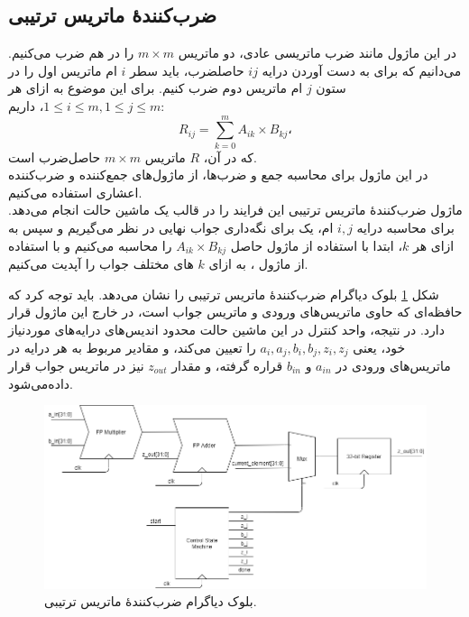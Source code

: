 \documentclass[conference]{IEEEtran-ModifiedForMVIP}
\begin{document}
\subsection{
    ضرب‌کنندهٔ ماتریس ترتیبی
}

در این ماژول مانند ضرب ماتریسی عادی، دو ماتریس 
$m \times m$
را در هم ضرب می‌کنیم. می‌دانیم که برای به دست آوردن درایه 
$ij$
حاصلضرب، باید سطر $i$ ام ماتریس اول را در ستون $j$ ام ماتریس دوم ضرب کنیم. برای این موضوع به ازای هر 
$1\leq i\leq m , 1\leq j\leq m $،
داریم:
$$R_{ij} = \sum_{k=0}^m{A_{ik} \times B_{kj}}،$$
که در آن،
$R$
ماتریس
$m \times m$
حاصل‌ضرب است.\\
در این ماژول برای محاسبه جمع و ضرب‌ها، از ماژول‌های جمع‌کننده و ضرب‌کننده اعشاری
 استفاده می‌کنیم.\\
ماژول ضرب‌کنندهٔ ماتریس ترتیبی
 این فرایند را در قالب یک ماشین حالت انجام می‌دهد. برای محاسبه درایه $i,j$ ام، یک 
 برای نگه‌داری جواب نهایی در نظر می‌گیریم و سپس
  به ازای هر $k$، ابتدا با استفاده از ماژول 
  حاصل
$A_{ik}\times B_{kj}$
 را محاسبه می‌کنیم و با استفاده از ماژول
 ، به ازای $k$ های مختلف جواب را آپدیت می‌کنیم.  

شکل
\ref{fig:SequentialBD}
بلوک دیاگرام ضرب‌کنندهٔ ماتریس ترتیبی را نشان می‌دهد.
باید توجه کرد که حافظه‌ای که حاوی ماتریس‌های ورودی و ماتریس جواب است، در خارج این ماژول قرار دارد.
در نتیجه، واحد کنترل در این ماشین حالت محدود
اندیس‌های درایه‌های موردنیاز خود، یعنی
$a_i, a_j, b_i, b_j, z_i, z_j$
را تعیین می‌کند، و مقادیر مربوط به هر درایه در ماتریس‌های ورودی در
$a_{in}$
و
$b_{in}$
قراره گرفته، و مقدار
$z_{out}$
نیز در ماتریس جواب قرار داده‌می‌شود.


\begin{figure}[t]
\centering 
\includegraphics[width=1\linewidth]{Images/SequentialBD.png}
\caption{
\centering
بلوک دیاگرام ضرب‌کنندهٔ ماتریس ترتیبی.
}\label{fig:SequentialBD}
\end{figure}
\end{document}
